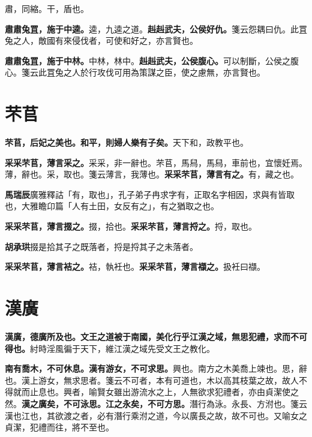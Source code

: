 \begin{quoting}肅，同縮。干，盾也。\end{quoting}

\textbf{肅肅兔罝，施于中逵。}{\footnotesize 逵，九逵之道。}\textbf{赳赳武夫，公侯好仇。}{\footnotesize 箋云怨耦曰仇。此罝兔之人，敵國有來侵伐者，可使和好之，亦言賢也。}

\textbf{肅肅兔罝，施于中林。}{\footnotesize 中林，林中。}\textbf{赳赳武夫，公侯腹心。}{\footnotesize 可以制斷，公侯之腹心。箋云此罝兔之人於行攻伐可用為策謀之臣，使之慮無，亦言賢也。}

\section{芣苢}


\textbf{芣苢，后妃之美也。和平，則婦人樂有子矣。}{\footnotesize 天下和，政教平也。}

\textbf{采采芣苢，薄言采之。}{\footnotesize 采采，非一辭也。芣苢，馬舄，馬舄，車前也，宜懷妊焉。薄，辭也。采，取也。箋云薄言，我薄也。}\textbf{采采芣苢，薄言有之。}{\footnotesize 有，藏之也。}

\begin{quoting}\textbf{馬瑞辰}廣雅釋詁「有，取也」，孔子弟子冉求字有，正取名字相因，求與有皆取也，大雅瞻卬篇「人有土田，女反有之」，有之猶取之也。\end{quoting}

\textbf{采采芣苢，薄言掇之。}{\footnotesize 掇，拾也。}\textbf{采采芣苢，薄言捋之。}{\footnotesize 捋，取也。}

\begin{quoting}\textbf{胡承珙}掇是拾其子之既落者，捋是捋其子之未落者。\end{quoting}

\textbf{采采芣苢，薄言袺之。}{\footnotesize 袺，執衽也。}\textbf{采采芣苢，薄言襭之。}{\footnotesize 扱衽曰襭。}

\section{漢廣}


\textbf{漢廣，德廣所及也。文王之道被于南國，美化行乎江漢之域，無思犯禮，求而不可得也。}{\footnotesize 紂時淫風徧于天下，維江漢之域先受文王之教化。}

\textbf{南有喬木，不可休息。漢有游女，不可求思。}{\footnotesize 興也。南方之木美喬上竦也。思，辭也。漢上游女，無求思者。箋云不可者，本有可道也，木以高其枝葉之故，故人不得就而止息也。興者，喻賢女雖出游流水之上，人無欲求犯禮者，亦由貞潔使之然。}\textbf{漢之廣矣，不可泳思。江之永矣，不可方思。}{\footnotesize 潛行為泳。永長、方泭也。箋云漢也江也，其欲渡之者，必有潛行乘泭之道，今以廣長之故，故不可也。又喻女之貞潔，犯禮而往，將不至也。}

